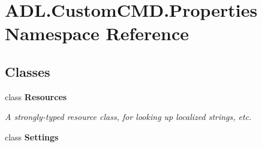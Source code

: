 \hypertarget{namespace_a_d_l_1_1_custom_c_m_d_1_1_properties}{}\section{A\+D\+L.\+Custom\+C\+M\+D.\+Properties Namespace Reference}
\label{namespace_a_d_l_1_1_custom_c_m_d_1_1_properties}
\subsection*{Classes}
\begin{DoxyCompactItemize}
\item 
class {\bfseries Resources}
\begin{DoxyCompactList}\small\item\em A strongly-\/typed resource class, for looking up localized strings, etc. \end{DoxyCompactList}\item 
class {\bfseries Settings}
\end{DoxyCompactItemize}
